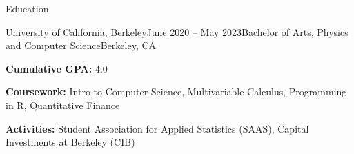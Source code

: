 \documentclass{resume} %
\begin{document}

\begin{rSection}{Education}
    \begin{rSubsection}{University of California, Berkeley}{June 2020 – May 2023}{Bachelor of Arts, Physics and Computer Science}{Berkeley, CA}
        \item {\bf Cumulative GPA:} 4.0
        \item {\bf Coursework:} Intro to Computer Science, Multivariable Calculus, Programming in R, Quantitative Finance
        \item {\bf Activities:} Student Association for Applied Statistics (SAAS), Capital Investments at Berkeley (CIB)
        \end{rSubsection}
    \end{rSection}

\end{document}
